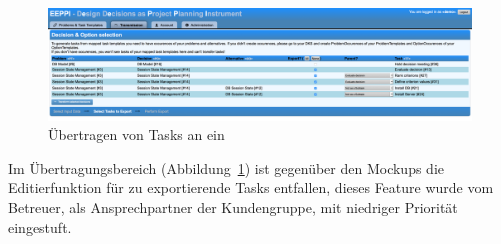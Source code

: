 			
		\begin{figure}[H]
			\centering
			\includegraphics[width=\linewidth]{tutorial/img/transmit2.png}
			\caption{Übertragen von Tasks an ein \ppt}
			\label{fig:eeppiTransmissionScreen}
		\end{figure}	
		
		Im Übertragungsbereich (Abbildung\ \ref{fig:eeppiTransmissionScreen}) ist gegenüber den Mockups die Editierfunktion für zu exportierende Tasks entfallen,
		dieses Feature wurde vom Betreuer, als Ansprechpartner der Kundengruppe, mit niedriger Priorität eingestuft.
